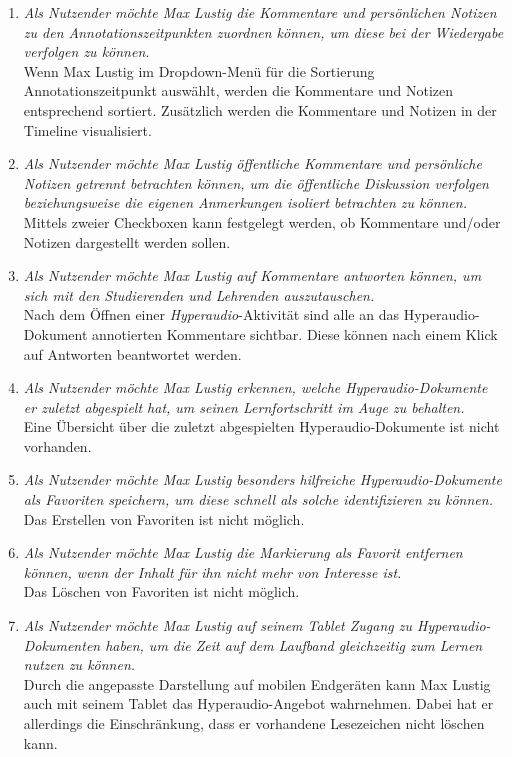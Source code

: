 \begin{enumerate}[label=US-\arabic*:,ref=US-\arabic*]
\item \label{US-Sortierung-Zeitpunkt-Eval} \textit{Als Nutzender möchte Max Lustig die Kommentare und persönlichen Notizen zu den Annotationszeitpunkten zuordnen können, um diese bei der Wiedergabe verfolgen zu können.}\\
Wenn Max Lustig im Dropdown-Menü für die Sortierung \glqq Annotationszeitpunkt\grqq{} auswählt, werden die Kommentare und Notizen entsprechend sortiert. Zusätzlich werden die Kommentare und Notizen in der Timeline visualisiert.

\item \label{US-Filter-Eval} \textit{Als Nutzender möchte Max Lustig öffentliche Kommentare und persönliche Notizen getrennt betrachten können, um die öffentliche Diskussion verfolgen beziehungsweise die eigenen Anmerkungen isoliert betrachten zu können.}\\
Mittels zweier Checkboxen kann festgelegt werden, ob Kommentare und/oder Notizen dargestellt werden sollen.

\item \label{US-Antwort-S-Eval} \textit{Als Nutzender möchte Max Lustig auf Kommentare antworten können, um sich mit den Studierenden und Lehrenden auszutauschen.}\\
Nach dem Öffnen einer \textit{Hyperaudio}-Aktivität sind alle an das Hyperaudio-Dokument annotierten Kommentare sichtbar. Diese können nach einem Klick auf \glqq Antworten\grqq{} beantwortet werden.

\item \label{US-Uebersicht-Letzte-Eval} \textit{Als Nutzender möchte Max Lustig erkennen, welche Hyperaudio-Dokumente er zuletzt abgespielt hat, um seinen Lernfortschritt im Auge zu behalten.}\\
Eine Übersicht über die zuletzt abgespielten Hyperaudio-Dokumente ist nicht vorhanden.

\item \label{US-Favoriten-Eval} \textit{Als Nutzender möchte Max Lustig besonders hilfreiche Hyperaudio-Dokumente als Favoriten speichern, um diese schnell als solche identifizieren zu können.}\\
Das Erstellen von Favoriten ist nicht möglich.

\item \label{US-Favoriten-Loeschen-Eval} \textit{Als Nutzender möchte Max Lustig die Markierung als Favorit entfernen können, wenn der Inhalt für ihn nicht mehr von Interesse ist.}\\
Das Löschen von Favoriten ist nicht möglich.

\item \label{US-Zeit-Mobil-Eval} \textit{Als Nutzender möchte Max Lustig auf seinem Tablet Zugang zu Hyperaudio-Dokumenten haben, um die Zeit auf dem Laufband gleichzeitig zum Lernen nutzen zu können.}\\
Durch die angepasste Darstellung auf mobilen Endgeräten kann Max Lustig auch mit seinem Tablet das Hyperaudio-Angebot wahrnehmen. Dabei hat er allerdings die Einschränkung, dass er vorhandene Lesezeichen nicht löschen kann.
\end{enumerate}

